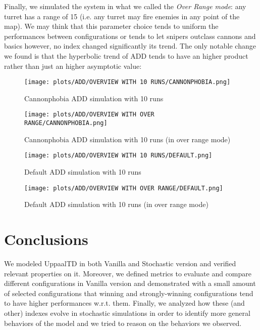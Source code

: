 \documentclass[
10pt, %
a4paper, %
oneside, %
headinclude,footinclude, %
BCOR5mm, %
]{scrartcl}
\begin{document}
			Finally, we simulated the system in what we called the \emph{Over Range mode}: any turret has a range of 15 (i.e. any turret may fire enemies in any point of the map). We may think that this parameter choice tends to uniform the performances between configurations or tends to let snipers outclass cannons and basics however, no index changed significantly its trend. The only notable change we found is that the hyperbolic trend of ADD tends to have an higher product rather than just an higher asymptotic value:
			\begin{figure}[H]
				\centering
				\begin{minipage}{.4\textwidth}
					\centering
					\texttt{[image: plots/ADD/OVERVIEW WITH 10 RUNS/CANNONPHOBIA.png]}
					\caption{Cannonphobia ADD simulation with 10 runs}
				\end{minipage}
				\begin{minipage}{.4\textwidth}
					\centering
					\texttt{[image: plots/ADD/OVERVIEW WITH OVER RANGE/CANNONPHOBIA.png]}
					\caption{Cannonphobia ADD simulation with 10 runs (in over range mode)}
				\end{minipage}
			\end{figure}
			\begin{figure}[H]
				\centering
				\begin{minipage}{.4\textwidth}
					\centering
					\texttt{[image: plots/ADD/OVERVIEW WITH 10 RUNS/DEFAULT.png]}
					\caption{Default ADD simulation with 10 runs}
				\end{minipage}
				\begin{minipage}{.4\textwidth}
					\centering
					\texttt{[image: plots/ADD/OVERVIEW WITH OVER RANGE/DEFAULT.png]}
					\caption{Default ADD simulation with 10 runs (in over range mode)}
				\end{minipage}
			\end{figure}
	\section{Conclusions}
		We modeled UppaalTD in both Vanilla and Stochastic version and verified relevant properties on it. Moreover, we defined metrics to evaluate and compare different configurations in Vanilla version and demonstrated with a small amount of selected configurations that winning and strongly-winning configurations tend to have higher performances w.r.t. them. Finally, we analyzed how these (and other) indexes evolve in stochastic simulations in order to identify more general behaviors of the model and we tried to reason on the behaviors we observed.
	\newpage
	\appendix
\end{document}
